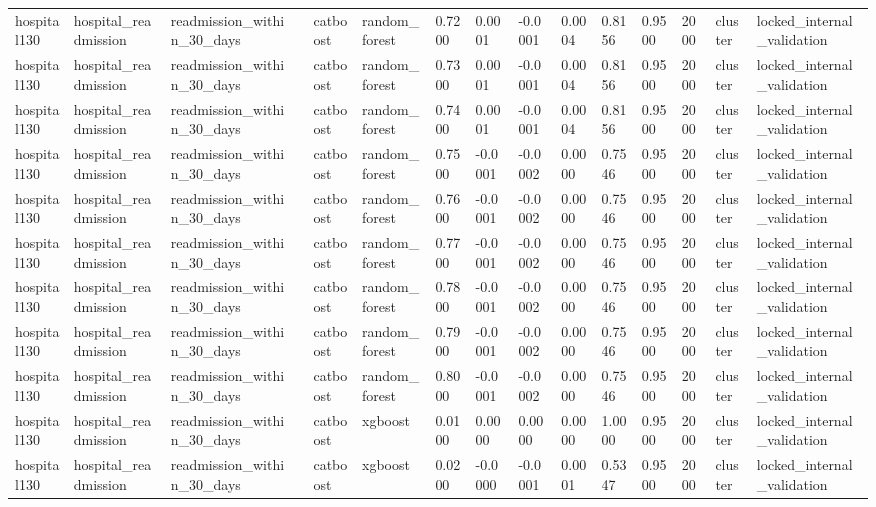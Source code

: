 \begin{tabular}{lllllllllllllll}
hospital130 & hospital\_readmission & readmission\_within\_30\_days &  & catboost & random\_forest & 0.7200 & 0.0001 & -0.0001 & 0.0004 & 0.8156 & 0.9500 & 2000 & cluster & locked\_internal\_validation \\
hospital130 & hospital\_readmission & readmission\_within\_30\_days &  & catboost & random\_forest & 0.7300 & 0.0001 & -0.0001 & 0.0004 & 0.8156 & 0.9500 & 2000 & cluster & locked\_internal\_validation \\
hospital130 & hospital\_readmission & readmission\_within\_30\_days &  & catboost & random\_forest & 0.7400 & 0.0001 & -0.0001 & 0.0004 & 0.8156 & 0.9500 & 2000 & cluster & locked\_internal\_validation \\
hospital130 & hospital\_readmission & readmission\_within\_30\_days &  & catboost & random\_forest & 0.7500 & -0.0001 & -0.0002 & 0.0000 & 0.7546 & 0.9500 & 2000 & cluster & locked\_internal\_validation \\
hospital130 & hospital\_readmission & readmission\_within\_30\_days &  & catboost & random\_forest & 0.7600 & -0.0001 & -0.0002 & 0.0000 & 0.7546 & 0.9500 & 2000 & cluster & locked\_internal\_validation \\
hospital130 & hospital\_readmission & readmission\_within\_30\_days &  & catboost & random\_forest & 0.7700 & -0.0001 & -0.0002 & 0.0000 & 0.7546 & 0.9500 & 2000 & cluster & locked\_internal\_validation \\
hospital130 & hospital\_readmission & readmission\_within\_30\_days &  & catboost & random\_forest & 0.7800 & -0.0001 & -0.0002 & 0.0000 & 0.7546 & 0.9500 & 2000 & cluster & locked\_internal\_validation \\
hospital130 & hospital\_readmission & readmission\_within\_30\_days &  & catboost & random\_forest & 0.7900 & -0.0001 & -0.0002 & 0.0000 & 0.7546 & 0.9500 & 2000 & cluster & locked\_internal\_validation \\
hospital130 & hospital\_readmission & readmission\_within\_30\_days &  & catboost & random\_forest & 0.8000 & -0.0001 & -0.0002 & 0.0000 & 0.7546 & 0.9500 & 2000 & cluster & locked\_internal\_validation \\
hospital130 & hospital\_readmission & readmission\_within\_30\_days &  & catboost & xgboost & 0.0100 & 0.0000 & 0.0000 & 0.0000 & 1.0000 & 0.9500 & 2000 & cluster & locked\_internal\_validation \\
hospital130 & hospital\_readmission & readmission\_within\_30\_days &  & catboost & xgboost & 0.0200 & -0.0000 & -0.0001 & 0.0001 & 0.5347 & 0.9500 & 2000 & cluster & locked\_internal\_validation \\

\end{tabular}
